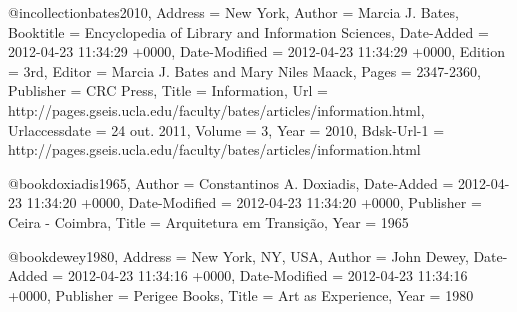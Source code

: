 @incollection{bates2010,
	Address = {New York},
	Author = {Marcia J. Bates},
	Booktitle = {Encyclopedia of Library and Information Sciences},
	Date-Added = {2012-04-23 11:34:29 +0000},
	Date-Modified = {2012-04-23 11:34:29 +0000},
	Edition = {3rd},
	Editor = {Marcia J. Bates and Mary Niles Maack},
	Pages = {2347-2360},
	Publisher = {CRC Press},
	Title = {Information},
	Url = {http://pages.gseis.ucla.edu/faculty/bates/articles/information.html},
	Urlaccessdate = {24 out. 2011},
	Volume = {3},
	Year = {2010},
	Bdsk-Url-1 = {http://pages.gseis.ucla.edu/faculty/bates/articles/information.html}}

@book{doxiadis1965,
	Author = {Constantinos A. Doxiadis},
	Date-Added = {2012-04-23 11:34:20 +0000},
	Date-Modified = {2012-04-23 11:34:20 +0000},
	Publisher = {Ceira - Coimbra},
	Title = {Arquitetura em Transi{\c c}{\~a}o},
	Year = {1965}}

@book{dewey1980,
	Address = {New York, NY, USA},
	Author = {John Dewey},
	Date-Added = {2012-04-23 11:34:16 +0000},
	Date-Modified = {2012-04-23 11:34:16 +0000},
	Publisher = {Perigee Books},
	Title = {Art as Experience},
	Year = {1980}}

